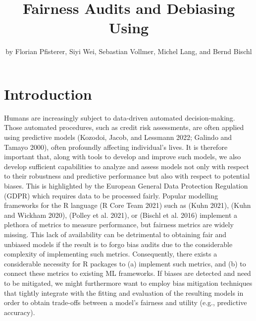 \title{Fairness Audits and Debiasing Using }


\author{by Florian Pfisterer, Siyi Wei, Sebastian Vollmer, Michel Lang, and Bernd Bischl}

\maketitle


\hypertarget{introduction}{%
\section{Introduction}\label{introduction}}

Humans are increasingly subject to data-driven automated decision-making.
Those automated procedures, such as credit risk assessments, are often applied using predictive models (Kozodoi, Jacob, and Lessmann 2022; Galindo and Tamayo 2000), often profoundly affecting individual's lives.
It is therefore important that, along with tools to develop and improve such models, we also develop sufficient capabilities to analyze and assess models not only with respect to their robustness and predictive performance but also with respect to potential biases.
This is highlighted by the European General Data Protection Regulation (GDPR) which requires data to be processed fairly.
Popular modelling frameworks for the R language (R Core Team 2021) such as  (Kuhn 2021),  (Kuhn and Wickham 2020),  (Polley et al. 2021), or  (Bischl et al. 2016) implement a plethora of metrics to measure performance, but fairness metrics are widely missing.
This lack of availability can be detrimental to obtaining fair and unbiased models if the result is to forgo bias audits due to the considerable complexity of implementing such metrics.
Consequently, there exists a considerable necessity for R packages to (a) implement such metrics, and (b) to connect these metrics to existing ML frameworks.
If biases are detected and need to be mitigated, we might furthermore want to employ bias mitigation techniques that tightly integrate with the fitting and evaluation of the resulting models in order to obtain trade-offs between a model's fairness and utility (e.g., predictive accuracy).

